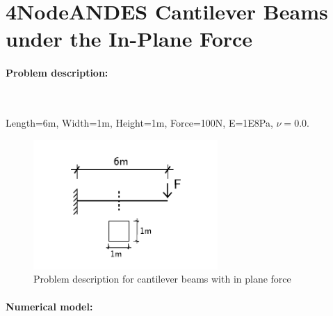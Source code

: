 \documentclass[fleqn,11pt]{article}
\begin{document}













\section{4NodeANDES Cantilever Beams under the In-Plane Force}

\paragraph{Problem description:} ~

Length=6m, Width=1m, Height=1m, Force=100N, E=1E8Pa, $\nu=0.0$. 

\begin{figure}[!htb]
  \centering
  \includegraphics[width=7cm]{../Figure-files/_Chapter_Appendix_Illustrative_Examples/cantilever_6.pdf}
  \caption{Problem description for cantilever beams with in plane force}
  \label{fig Problem description for cantilever 4 2}
\end{figure}

\paragraph{Numerical model:} ~
\end{document}

